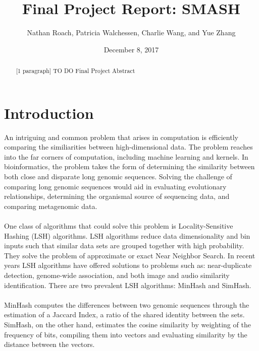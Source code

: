 \documentclass[12pt, letterpaper]{article}
\title{Final Project Report: SMASH}
\author{Nathan Roach, Patricia Walchessen, Charlie Wang, and Yue Zhang}
\date{December 8, 2017}
\begin{document}
\maketitle

\begin{abstract}
	[1 paragraph] \color{red} TO DO \color{black} Final Project Abstract
\end{abstract}


\section{Introduction}
An intriguing and common problem that arises in computation is efficiently comparing the similiarities between high-dimensional data. The problem reaches into the far corners of computation, including machine learning and kernels. In bioinformatics, the problem takes the form of determining the similarity between both close and disparate long genomic sequences. Solving the challenge of comparing long genomic sequences would aid in evaluating evolutionary relationships, determining the organismal source of sequencing data, and comparing metagenomic data. \\ \\
One class of algorithms that could solve this problem is Locality-Sensitive Hashing (LSH) algorithms. LSH algorithms reduce data dimensionality and bin inputs such that similar data sets are grouped together with high probability. They solve the problem of approximate or exact Near Neighbor Search. In recent years LSH algorithms have offered solutions to problems such as: near-duplicate detection, genome-wide association, and both image and audio similarity identification. There are two prevalent LSH algorithms: MinHash and SimHash. \\ \\
MinHash computes the differences between two genomic sequences through the estimation of a Jaccard Index, a ratio of the  shared identity between the sets. SimHash, on the other hand, estimates the cosine similarity by weighting of the frequency of bits, compiling them into vectors and evaluating similarity by the distance between the vectors.
\end{document}
